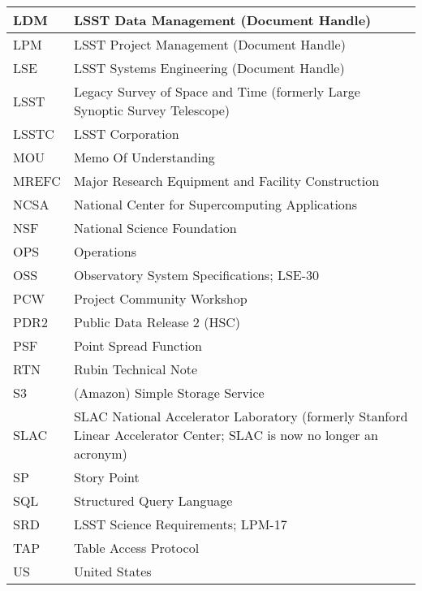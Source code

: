 \begin{longtable}{p{}p{}}
LDM & LSST Data Management (Document Handle) \\\hline
LPM & LSST Project Management (Document Handle) \\\hline
LSE & LSST Systems Engineering (Document Handle) \\\hline
LSST & Legacy Survey of Space and Time (formerly Large Synoptic Survey Telescope) \\\hline
LSSTC & LSST Corporation \\\hline
MOU & Memo Of Understanding \\\hline
MREFC & Major Research Equipment and Facility Construction \\\hline
NCSA & National Center for Supercomputing Applications \\\hline
NSF & National Science Foundation \\\hline
OPS & Operations \\\hline
OSS & Observatory System Specifications; LSE-30 \\\hline
PCW & Project Community Workshop \\\hline
PDR2 & Public Data Release 2 (HSC) \\\hline
PSF & Point Spread Function \\\hline
RTN & Rubin Technical Note \\\hline
S3 & (Amazon) Simple Storage Service  \\\hline
SLAC & SLAC National Accelerator Laboratory (formerly Stanford Linear Accelerator Center; SLAC is now no longer an acronym) \\\hline
SP & Story Point \\\hline
SQL & Structured Query Language \\\hline
SRD & LSST Science Requirements; LPM-17 \\\hline
TAP & Table Access Protocol \\\hline
US & United States \\\hline
\end{longtable}
